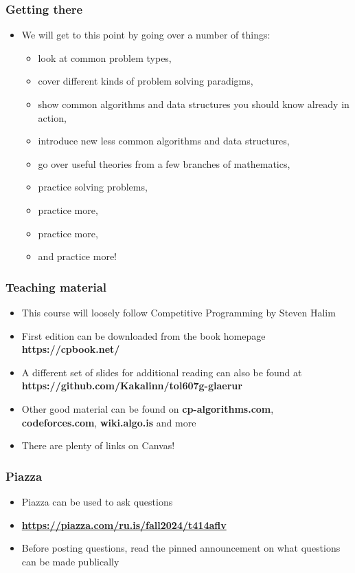 \documentclass{beamer}
\begin{document}
\begin{frame}[plain]
	\frametitle{Getting there}
	\begin{itemize}
		 \item We will get to this point by going over a number of things:
		 \begin{itemize}
		 	\item look at common problem types,
		 	\item cover different kinds of problem solving paradigms,
		 	\item show common algorithms and data structures you should know already in action,
		 	\item introduce new less common algorithms and data structures,
		 	\item go over useful theories from a few branches of mathematics,
		 	\item practice solving problems,
		 	\item practice more,
		 	\item practice more,
		 	\item and practice more!
		 \end{itemize}
	\end{itemize}
\end{frame}

\begin{frame}[plain]
	\frametitle{Teaching material}
	\begin{itemize}
		 \item This course will loosely follow \alert{Competitive Programming} by Steven Halim
		 \item First edition can be downloaded from the book homepage \textbf{https://cpbook.net/}
		 \item A different set of slides for additional reading can also be found at \textbf{https://github.com/Kakalinn/tol607g-glaerur}
         \item Other good material can be found on \textbf{cp-algorithms.com}, \textbf{codeforces.com}, \textbf{wiki.algo.is} and more
         \item There are plenty of links on Canvas!
     \end{itemize}
\end{frame}

\begin{frame}[plain]
	\frametitle{Piazza}
	\begin{itemize}
		\item Piazza can be used to ask questions
        \item \textbf{\url{https://piazza.com/ru.is/fall2024/t414aflv}}
        \item Before posting questions, read the pinned announcement on what questions can be made publically
	\end{itemize}
\end{frame}
\end{document}
